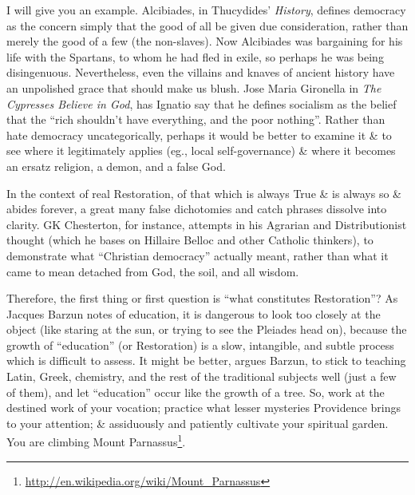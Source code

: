 I will give you an example. Alcibiades, in Thucydides' \emph{History}, defines democracy as the concern simply that the good of all be given due consideration, rather than merely the good of a few (the non-slaves). Now Alcibiades was bargaining for his life with the Spartans, to whom he had fled in exile, so perhaps he was being disingenuous. Nevertheless, even the villains and knaves of ancient history have an unpolished grace that should make us blush. Jose Maria Gironella in \emph{The Cypresses Believe in God}, has Ignatio say that he defines socialism as the belief that the ``rich shouldn't have everything, and the poor nothing''. Rather than hate democracy uncategorically, perhaps it would be better to examine it \& to see where it legitimately applies (eg., local self-governance) \& where it becomes an ersatz religion, a demon, and a false God.

In the context of real Restoration, of that which is always True \& is always so \& abides forever, a great many false dichotomies and catch phrases dissolve into clarity. GK Chesterton, for instance, attempts in his Agrarian and Distributionist thought (which he bases on Hillaire Belloc and other Catholic thinkers), to demonstrate what ``Christian democracy'' actually meant, rather than what it came to mean detached from God, the soil, and all wisdom.

Therefore, the first thing or first question is ``what constitutes Restoration''? As Jacques Barzun notes of education, it is dangerous to look too closely at the object (like staring at the sun, or trying to see the Pleiades head on), because the growth of ``education'' (or Restoration) is a slow, intangible, and subtle process which is difficult to assess. It might be better, argues Barzun, to stick to teaching Latin, Greek, chemistry, and the rest of the traditional subjects well (just a few of them), and let ``education'' occur like the growth of a tree. So, work at the destined work of your vocation; practice what lesser mysteries Providence brings to your attention; \& assiduously and patiently cultivate your spiritual garden. You are climbing Mount Parnassus\footnote{\url{http://en.wikipedia.org/wiki/Mount\_Parnassus}}.

